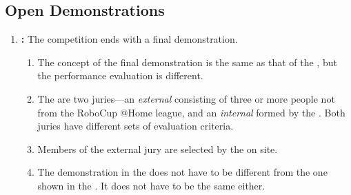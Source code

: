 \subsection{Open Demonstrations}
\label{sec:open-demonstrations}
\begin{enumerate}

	
	\item \textbf{:} The competition ends with a final demonstration.
	\begin{enumerate}
		\item The concept of the final demonstration is the same as that of the , but the performance evaluation is different. 
		\item The are two juries---an \emph{external} consisting of three or more people not from the RoboCup @Home league, and an \emph{internal} formed by the . Both juries have different sets of evaluation criteria.
		\item Members of the external jury are selected by the  on site. 
		\item The demonstration in the  does not have to be different from the one shown in the . It does not have to be the same either.
	\end{enumerate}
\end{enumerate}



